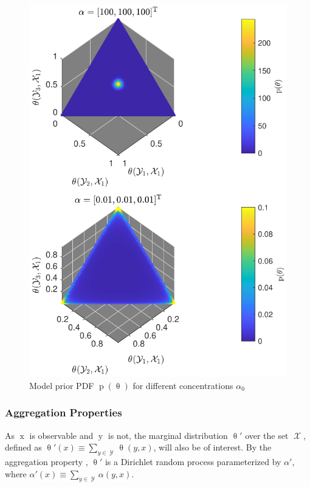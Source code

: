 \documentclass[conference]{IEEEtran}
\DeclareMathOperator{\xrm}{\mathrm{x}}
\DeclareMathOperator{\yrm}{\mathrm{y}}
\DeclareMathOperator{\prm}{\mathrm{p}}
\DeclareMathOperator{\Xcal}{\mathcal{X}}
\DeclareMathOperator{\Ycal}{\mathcal{Y}}
\begin{document}
\begin{figure}
\centering
\includegraphics[width=1\linewidth]{P_theta.pdf}
\caption{Model prior PDF $\prm(\uptheta)$ for different concentrations $\alpha_0$}
\label{fig:P_theta}
\end{figure}



\subsubsection{Aggregation Properties}

As $\xrm$ is observable and $\yrm$ is not, the marginal distribution $\uptheta'$ over the set $\Xcal$, defined as $\uptheta'(x) \equiv \sum_{y \in \Ycal} \uptheta(y,x)$, will also be of interest. By the aggregation property \cite{ferguson}, $\uptheta'$ is a Dirichlet random process parameterized by $\alpha'$, where $\alpha'(x) \equiv \sum_{y \in \Ycal} \alpha(y,x)$. 
\end{document}
